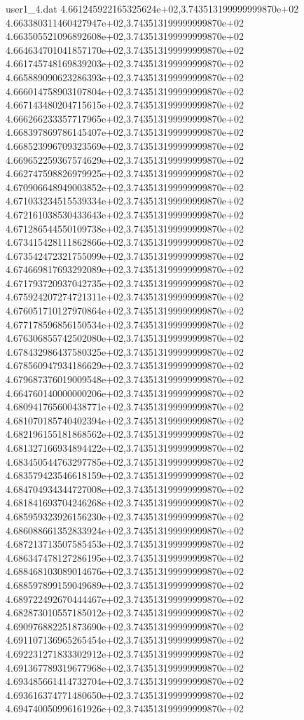 \begin{filecontents}{user1_4.dat}
4.661245922165325624e+02,3.743513199999999870e+02
4.663380311460427947e+02,3.743513199999999870e+02
4.663505521096892608e+02,3.743513199999999870e+02
4.664634701041857170e+02,3.743513199999999870e+02
4.661745748169839203e+02,3.743513199999999870e+02
4.665889090623286393e+02,3.743513199999999870e+02
4.666014758903107804e+02,3.743513199999999870e+02
4.667143480204715615e+02,3.743513199999999870e+02
4.666266233357717965e+02,3.743513199999999870e+02
4.668397869786145407e+02,3.743513199999999870e+02
4.668523996709323569e+02,3.743513199999999870e+02
4.669652259367574629e+02,3.743513199999999870e+02
4.662747598826979925e+02,3.743513199999999870e+02
4.670906648949003852e+02,3.743513199999999870e+02
4.671033234515539334e+02,3.743513199999999870e+02
4.672161038530433643e+02,3.743513199999999870e+02
4.671286544550109738e+02,3.743513199999999870e+02
4.673415428111862866e+02,3.743513199999999870e+02
4.673542472321755099e+02,3.743513199999999870e+02
4.674669817693292089e+02,3.743513199999999870e+02
4.671793720937042735e+02,3.743513199999999870e+02
4.675924207274721311e+02,3.743513199999999870e+02
4.676051710127970864e+02,3.743513199999999870e+02
4.677178596856150534e+02,3.743513199999999870e+02
4.676306855742502080e+02,3.743513199999999870e+02
4.678432986437580325e+02,3.743513199999999870e+02
4.678560947934186629e+02,3.743513199999999870e+02
4.679687376019009548e+02,3.743513199999999870e+02
4.664760140000000206e+02,3.743513199999999870e+02
4.680941765600438771e+02,3.743513199999999870e+02
4.681070185740402394e+02,3.743513199999999870e+02
4.682196155181868562e+02,3.743513199999999870e+02
4.681327166934894422e+02,3.743513199999999870e+02
4.683450544763297785e+02,3.743513199999999870e+02
4.683579423546618159e+02,3.743513199999999870e+02
4.684704934344727008e+02,3.743513199999999870e+02
4.681841693704246268e+02,3.743513199999999870e+02
4.685959323926156230e+02,3.743513199999999870e+02
4.686088661352833924e+02,3.743513199999999870e+02
4.687213713507585453e+02,3.743513199999999870e+02
4.686347478127286195e+02,3.743513199999999870e+02
4.688468103089014676e+02,3.743513199999999870e+02
4.688597899159049689e+02,3.743513199999999870e+02
4.689722492670444467e+02,3.743513199999999870e+02
4.682873010557185012e+02,3.743513199999999870e+02
4.690976882251873690e+02,3.743513199999999870e+02
4.691107136965265454e+02,3.743513199999999870e+02
4.692231271833302912e+02,3.743513199999999870e+02
4.691367789319677968e+02,3.743513199999999870e+02
4.693485661414732704e+02,3.743513199999999870e+02
4.693616374771480650e+02,3.743513199999999870e+02
4.694740050996161926e+02,3.743513199999999870e+02

\end{filecontents}
